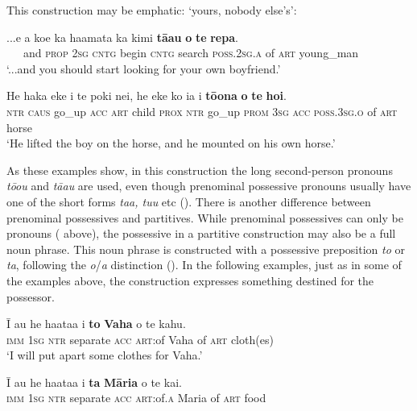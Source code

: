This construction may be emphatic: ‘yours, nobody else’s’:

\ea\label{ex:6.19}
\gll ...{\ꞌ}e a koe ka ha{\ꞌ}amata ka kimi \textbf{tā{\ꞌ}au} \textbf{o} \textbf{te} \textbf{repa}. \\
~~~and \textsc{prop} \textsc{2sg} \textsc{cntg} begin \textsc{cntg} search \textsc{poss.2sg.a} of \textsc{art} young\_man \\

\glt 
‘...and you should start looking for your own boyfriend.’ \textstyleExampleref{[R315.258]} 
\z

\ea\label{ex:6.20}
\gll He haka eke i te poki nei, he eke ko ia i \textbf{tō{\ꞌ}ona} \textbf{o} \textbf{te} \textbf{hoi}. \\
\textsc{ntr} \textsc{caus} go\_up \textsc{acc} \textsc{art} child \textsc{prox} \textsc{ntr} go\_up \textsc{prom} \textsc{3sg} \textsc{acc} \textsc{poss.3sg.o} of \textsc{art} horse \\

\glt 
‘He lifted the boy on the horse, and he mounted on his own horse.’ \textstyleExampleref{[R105.028]} 
\z

As these examples show, in this construction the long second-person pronouns \textit{tō{\ꞌ}ou} and \textit{tā{\ꞌ}au} are used, even though prenominal possessive pronouns usually have one of the short forms \textit{ta{\ꞌ}a, tu{\ꞌ}u} etc (). There is another difference between prenominal possessives and partitives. While prenominal possessives can only be pronouns ( above), the possessive in a partitive construction may also be a full noun phrase. This noun phrase is constructed with a possessive preposition \textit{to} or \textit{ta}, following the \textit{o}/\textit{a} distinction (). In the following examples, just as in some of the examples above, the construction expresses something destined for the possessor.

\ea\label{ex:6.21}
\gll {\ꞌ}Ī au he ha{\ꞌ}ata{\ꞌ}a i \textbf{to} \textbf{Vaha} o te kahu. \\
\textsc{imm} \textsc{1sg} \textsc{ntr} separate \textsc{acc} \textsc{art}:of Vaha of \textsc{art} cloth(es) \\

\glt 
‘I will put apart some clothes for Vaha.’ \textstyleExampleref{[R229.194]} 
\z

\ea\label{ex:6.22}
\gll {\ꞌ}Ī au he ha{\ꞌ}ata{\ꞌ}a i \textbf{ta} \textbf{Māria} o te kai. \\
\textsc{imm} \textsc{1sg} \textsc{ntr} separate \textsc{acc} \textsc{art}:of\textsc{.a} Maria of \textsc{art} food \\

